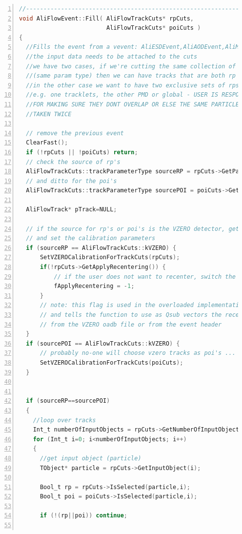 \documentclass[a4paper]{book}
\numberwithin{equation}{subsection}
\begin{document}
\begin{lstlisting}[language=C, numbers=left]
//-----------------------------------------------------------------------
void AliFlowEvent::Fill( AliFlowTrackCuts* rpCuts,
                         AliFlowTrackCuts* poiCuts )
{
  //Fills the event from a vevent: AliESDEvent,AliAODEvent,AliMCEvent
  //the input data needs to be attached to the cuts
  //we have two cases, if we're cutting the same collection of tracks
  //(same param type) then we can have tracks that are both rp and poi
  //in the other case we want to have two exclusive sets of rps and pois
  //e.g. one tracklets, the other PMD or global - USER IS RESPOSIBLE
  //FOR MAKING SURE THEY DONT OVERLAP OR ELSE THE SAME PARTICLE WILL BE
  //TAKEN TWICE

  // remove the previous event
  ClearFast();
  if (!rpCuts || !poiCuts) return;
  // check the source of rp's
  AliFlowTrackCuts::trackParameterType sourceRP = rpCuts->GetParamType();
  // and ditto for the poi's
  AliFlowTrackCuts::trackParameterType sourcePOI = poiCuts->GetParamType();
  
  AliFlowTrack* pTrack=NULL;
 
  // if the source for rp's or poi's is the VZERO detector, get the calibration 
  // and set the calibration parameters
  if (sourceRP == AliFlowTrackCuts::kVZERO) {
      SetVZEROCalibrationForTrackCuts(rpCuts);
      if(!rpCuts->GetApplyRecentering()) {
          // if the user does not want to recenter, switch the flag
          fApplyRecentering = -1;
      }
      // note: this flag is used in the overloaded implementation of Get2Qsub()
      // and tells the function to use as Qsub vectors the recentered Q-vectors
      // from the VZERO oadb file or from the event header
  }
  if (sourcePOI == AliFlowTrackCuts::kVZERO) {
      // probably no-one will choose vzero tracks as poi's ...
      SetVZEROCalibrationForTrackCuts(poiCuts); 
  }
  

  if (sourceRP==sourcePOI)
  {
    //loop over tracks
    Int_t numberOfInputObjects = rpCuts->GetNumberOfInputObjects();
    for (Int_t i=0; i<numberOfInputObjects; i++)
    {
      //get input object (particle)
      TObject* particle = rpCuts->GetInputObject(i);

      Bool_t rp = rpCuts->IsSelected(particle,i);
      Bool_t poi = poiCuts->IsSelected(particle,i);

      if (!(rp||poi)) continue;


\end{lstlisting}
\end{document}
